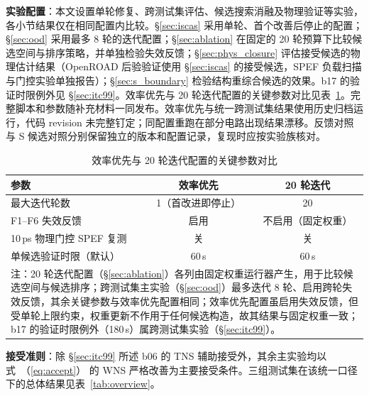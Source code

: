 \documentclass[twocolumn,10pt,fontset=windows]{ctexart}
\renewcommand{\eqref}[1]{\textup{（\ref{#1}）}}
\begin{document}
\textbf{实验配置}：本文设置单轮修复、跨测试集评估、候选搜索消融及物理验证等实验，各小节结果仅在相同配置内比较。\S\ref{sec:iscas} 采用单轮、首个改善后停止的配置；\S\ref{sec:ood} 采用最多 8 轮的迭代配置；\S\ref{sec:ablation} 在固定的 20 轮预算下比较候选空间与排序策略，并单独检验失效反馈；\S\ref{sec:phys_closure} 评估接受候选的物理估计结果（OpenROAD 后验验证使用 \S\ref{sec:iscas} 的接受候选，SPEF 负载扫描与门控实验单独报告）；\S\ref{sec:s_boundary} 检验结构重综合候选的效果。b17 的验证时限例外见 \S\ref{sec:itc99}。效率优先与 20 轮迭代配置的关键参数对比见表~\ref{tab:configs}。完整脚本和参数随补充材料一同发布。效率优先与统一跨测试集结果使用历史归档运行，代码 revision 未完整钉定；同配置重跑在部分电路出现结果漂移。反馈对照与 S 候选对照分别保留独立的版本和配置记录，复现时应按实验族核对。

\begin{table}[!htb]
\centering
\caption{效率优先与 20 轮迭代配置的关键参数对比}
\label{tab:configs}
\scriptsize
\setlength{\tabcolsep}{4pt}
\begin{tabular}{lcc}
\toprule
\textbf{参数} & \textbf{效率优先} & \textbf{20 轮迭代} \\
\midrule
最大迭代轮数                    & 1（首改进即停止） & 20 \\
F1--F6 失效反馈                  & 启用 & 不启用（固定权重） \\
10\,ps 物理门控 SPEF 复测        & 关 & 关 \\
单候选验证时限（默认）           & 60\,s & 60\,s \\
\bottomrule
\multicolumn{3}{p{0.95\columnwidth}}{\footnotesize 注：20 轮迭代配置（\S\ref{sec:ablation}）各列由固定权重运行器产生，用于比较候选空间与候选排序；跨测试集主实验（\S\ref{sec:ood}）最多迭代 8 轮、启用跨轮失效反馈，其余关键参数与效率优先配置相同；效率优先配置虽启用失效反馈，但受单轮上限约束，权重更新不作用于任何候选构造，故其结果与固定权重一致；b17 的验证时限例外（180\,s）属跨测试集实验（\S\ref{sec:itc99}）。}\\
\end{tabular}
\end{table}

\textbf{接受准则}：除 \S\ref{sec:itc99} 所述 b06 的 TNS 辅助接受外，其余主实验均以式~\eqref{eq:accept} 的 WNS 严格改善为主要接受条件。三组测试集在该统一口径下的总体结果见表~\ref{tab:overview}。
\end{document}
